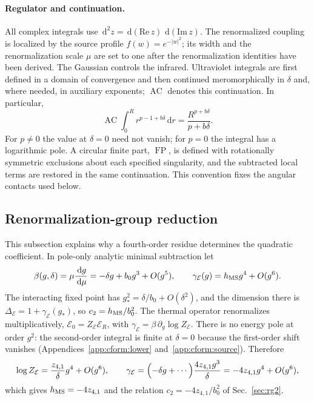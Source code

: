 \documentclass[11pt,a4paper]{article}
\numberwithin{equation}{section}
\newcommand{\dd}{\,\mathrm d}
\newcommand{\De}{\Delta_{\mathcal E}}
\newcommand{\AC}{\operatorname{AC}}
\newcommand{\FP}{\operatorname{FP}}
\newcommand{\hMS}{h_{\rm MS}}
\begin{document}
\paragraph{Regulator and continuation.} All complex integrals use $\dd^2z=\dd(\mathrm{Re}\,z)\,\dd(\mathrm{Im}\,z)$.
The renormalized coupling is localized by the source profile $f(w)=e^{-|w|^2}$; its width and the renormalization
scale $\mu$ are set to one after the renormalization identities have been derived. The Gaussian controls the
infrared. Ultraviolet integrals are first defined in a domain of convergence and then continued meromorphically in
$\delta$ and, where needed, in auxiliary exponents; $\AC$ denotes this continuation. In particular,
\begin{equation}
 \AC\!\int_0^R r^{p-1+b\delta}\dd r=\frac{R^{p+b\delta}}{p+b\delta}.
 \label{eq:cform:mellin}
\end{equation}
For $p\ne0$ the value at $\delta=0$ need not vanish; for $p=0$ the integral has a logarithmic pole. A circular finite
part, $\FP$, is defined with rotationally symmetric exclusions about each specified singularity, and the subtracted
local terms are restored in the same continuation. This convention fixes the angular contacts used below.

\subsection{Renormalization-group reduction}\label{app:cform:rg}
This subsection explains why a fourth-order residue determines the quadratic coefficient. In pole-only analytic
minimal subtraction let
\begin{equation}
 \beta(g,\delta)=\mu\frac{\dd g}{\dd\mu}=-\delta g+b_0g^3+O(g^5),\qquad
 \gamma_{\mathcal E}(g)=\hMS g^4+O(g^6).
\end{equation}
The interacting fixed point has $g_*^2=\delta/b_0+O(\delta^2)$, and the dimension there is
$\De=1+\gamma_{\mathcal E}(g_*)$, so $c_2=\hMS/b_0^2$. The thermal operator renormalizes multiplicatively,
$\mathcal E_0=Z_{\mathcal E}\mathcal E_R$, with $\gamma_{\mathcal E}=\beta\,\partial_g\log Z_{\mathcal E}$. There is no
energy pole at order $g^2$: the second-order integral is finite at $\delta=0$ because the first-order shift vanishes
(Appendices~\ref{app:cform:lower} and~\ref{app:cform:source}). Therefore
\begin{equation}
 \log Z_{\mathcal E}=\frac{z_{4,1}}{\delta}g^4+O(g^6),\qquad
 \gamma_{\mathcal E}=\Bigl(-\delta g+\cdots\Bigr)\frac{4z_{4,1}g^3}{\delta}=-4z_{4,1}g^4+O(g^6),
\end{equation}
which gives $\hMS=-4z_{4,1}$ and the relation $c_2=-4z_{4,1}/b_0^2$ of Sec.~\ref{sec:rg2}.
\end{document}
